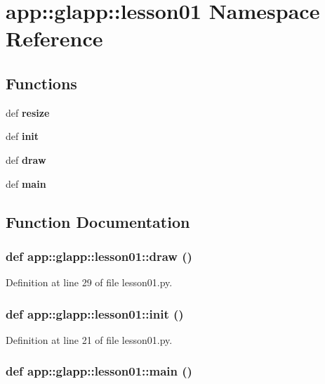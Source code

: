 \section{app::glapp::lesson01 Namespace Reference}
\label{namespaceapp_1_1glapp_1_1lesson01}


\subsection*{Functions}
\begin{CompactItemize}
\item 
def {\bf resize}
\item 
def {\bf init}
\item 
def {\bf draw}
\item 
def {\bf main}
\end{CompactItemize}


\subsection{Function Documentation}
\subsubsection{\setlength{\rightskip}{0pt plus 5cm}def app::glapp::lesson01::draw ()}\label{namespaceapp_1_1glapp_1_1lesson01_d5962316f17d38c041a7cbc1de98a300}




Definition at line 29 of file lesson01.py.
\subsubsection{\setlength{\rightskip}{0pt plus 5cm}def app::glapp::lesson01::init ()}\label{namespaceapp_1_1glapp_1_1lesson01_cc57de91ad7cde3d378ec14b15056029}




Definition at line 21 of file lesson01.py.
\subsubsection{\setlength{\rightskip}{0pt plus 5cm}def app::glapp::lesson01::main ()}\label{namespaceapp_1_1glapp_1_1lesson01_1e9b44e2a7573745f1a9e8c81a93c3f8}




